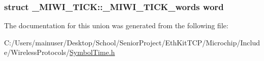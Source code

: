 \hypertarget{union___m_i_w_i___t_i_c_k_a9b9aceff5a9b43f59427a3ee0f715ef7}{}
\subsubsection[{word}]{\setlength{\rightskip}{0pt plus 5cm}struct {\bf \+\_\+\+M\+I\+W\+I\+\_\+\+T\+I\+C\+K\+::\+\_\+\+M\+I\+W\+I\+\_\+\+T\+I\+C\+K\+\_\+words}  word}\label{union___m_i_w_i___t_i_c_k_a9b9aceff5a9b43f59427a3ee0f715ef7}


The documentation for this union was generated from the following file\+:\begin{DoxyCompactItemize}
\item 
C\+:/\+Users/mainuser/\+Desktop/\+School/\+Senior\+Project/\+Eth\+Kit\+T\+C\+P/\+Microchip/\+Include/\+Wireless\+Protocols/\hyperlink{_symbol_time_8h}{Symbol\+Time.\+h}\end{DoxyCompactItemize}
